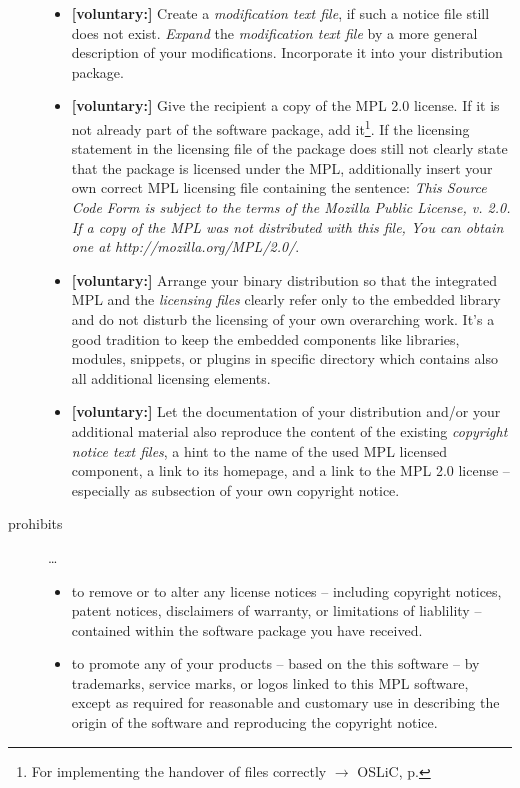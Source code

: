 \begin{description}
\begin{itemize}
  \item \textbf{[voluntary:]} Create a \emph{modification text file}, if such a
  notice file still does not exist. \emph{Expand} the \emph{modification text
  file} by a more general description of your modifications. Incorporate it into
  your distribution package.
  
  \item \textbf{[voluntary:]} Give the recipient a copy of the MPL 2.0 license.
  If it is not already part of the software package, add it\footnote{For
  implementing the handover of files correctly $\rightarrow$ OSLiC, p.
  \pageref{DistributingFilesHint}}. If the licensing statement in the licensing
  file of the package does still not clearly state that the package is licensed
  under the MPL, additionally insert your own correct MPL licensing file
  containing the sentence: \emph{This Source Code Form is subject to the terms
  of the Mozilla Public License, v. 2.0. If a copy of the MPL was not
  distributed with this file, You can obtain one at
  http://mozilla.org/MPL/2.0/}.

  \item \textbf{[voluntary:]} Arrange your binary distribution so that the
  integrated MPL and the \emph{licensing files} clearly refer only to the
  embedded library and do not disturb the licensing of your own overarching
  work. It's a good tradition to keep the embedded components like libraries,
  modules, snippets, or plugins in specific directory which contains also all
  additional licensing elements.
  
  
  \item \textbf{[voluntary:]} Let the documentation of your distribution and/or
  your additional material  also reproduce the content of the existing
  \emph{copyright notice text files}, a hint to the name of the used MPL
  licensed component, a link to its homepage, and a link to the MPL 2.0 license
  -- especially as subsection of your own copyright notice.
  
\end{itemize}

\item[prohibits] \ldots
\begin{itemize}
  \item to remove or to alter any license notices -- including copyright
  notices, patent notices, disclaimers of warranty, or limitations of liablility
  -- contained within the software package you have received.
  \item to promote any of your products -- based on the this software -- by
  trademarks, service marks, or logos linked to this MPL software, except as 
  required for reasonable and customary use in describing the origin
  of the software and reproducing the  copyright notice.
\end{itemize}

\end{description}

